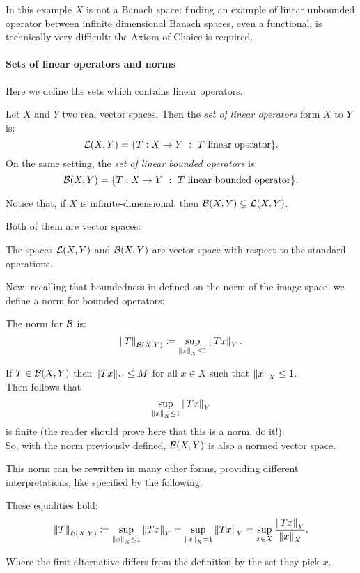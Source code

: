 In this example $X$ is not a Banach space: finding an example of linear unbounded operator between infinite dimensional Banach spaces, even a functional, is technically very difficult: the Axiom of Choice is required.

\paragraph{Sets of linear operators and norms} Here we define the sets which contains linear operators.

\begin{defn}
	Let $X$ and $Y$ two real vector spaces. Then the \emph{set of linear operators} form $X$ to $Y$ is: 
	$$\mathcal L(X,Y) = \{T:X\to Y\ : \ T \text{ linear operator}\}.$$
	On the same setting, the \emph{set of linear bounded operators} is:
	$$\mathcal B(X,Y) = \{T:X\to Y\ : \ T \text{ linear bounded operator}\}.$$
\end{defn}

Notice that, if $X$ is infinite-dimensional, then $\mathcal B(X,Y) \subsetneq \mathcal L(X,Y)$.

Both of them are vector spaces:
\begin{prop}
	The spaces $\mathcal L(X,Y)$ and $\mathcal B(X,Y)$ are vector space with respect to the standard operations.
\end{prop}

Now, recalling that boundedness in defined on the norm of the image space, we define a norm for bounded operators:

\begin{defn}
	The norm for $\mathcal B$ is: 
	$$
		\left\lVert T\right\rVert_{\mathcal B(X,Y)} 
		\coloneqq \sup_{\left\lVert x\right\rVert_X \leq 1} \left\lVert Tx\right\rVert_Y
	.
	$$
\end{defn}

If $T \in \mathcal B(X,Y)$ then $\left\lVert Tx\right\rVert_Y \leq M$ for all $x \in X$ such that $\left\lVert x\right\rVert_X \leq 1$.\\
Then follows that $$\sup_{\left\lVert x\right\rVert_X \leq 1} \left\lVert Tx\right\rVert_Y$$ is finite (the reader should prove here that this is a norm, do it!).\\
So, with the norm previously defined, $\mathcal B(X,Y)$ is also a normed vector space.

This norm can be rewritten in many other forms, providing different interpretations, like specified by the following.

\begin{prop}
	These equalities hold:
	$$
		\left\lVert T\right\rVert_{\mathcal B(X,Y)}
		\coloneqq \sup_{\left\lVert x\right\rVert_X \leq 1} \left\lVert Tx\right\rVert_Y
		= \sup_{\left\lVert x\right\rVert_X=1}\left\lVert Tx\right\rVert_Y
		= \sup_{x\in X}\frac{\left\lVert Tx\right\rVert_Y}{\left\lVert x\right\rVert_X}
		.
	$$
\end{prop}
Where the first alternative differs from the definition by the set they pick $x$.

